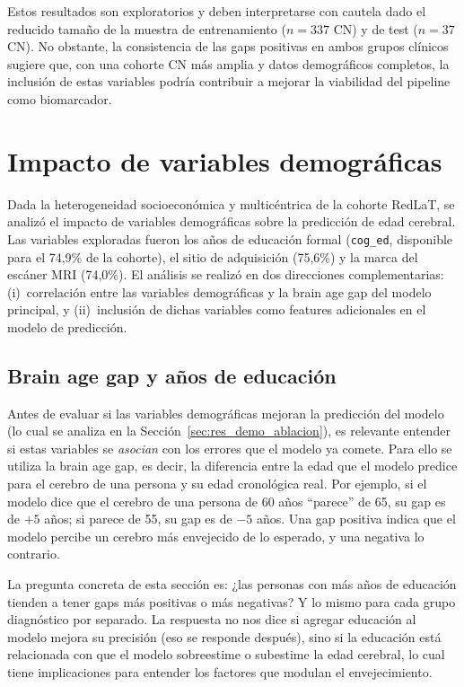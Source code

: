 Estos resultados son exploratorios y deben interpretarse con cautela dado el reducido tamaño de la muestra de entrenamiento ($n = 337$ CN) y de test ($n = 37$ CN). No obstante, la consistencia de las gaps positivas en ambos grupos clínicos sugiere que, con una cohorte CN más amplia y datos demográficos completos, la inclusión de estas variables podría contribuir a mejorar la viabilidad del pipeline como biomarcador.

\section{Impacto de variables demográficas}
\label{sec:res_demograficas}

Dada la heterogeneidad socioeconómica y multicéntrica de la cohorte RedLaT, se analizó el impacto de variables demográficas sobre la predicción de edad cerebral. Las variables exploradas fueron los años de educación formal (\texttt{cog\_ed}, disponible para el 74,9\% de la cohorte), el sitio de adquisición (75,6\%) y la marca del escáner MRI (74,0\%). El análisis se realizó en dos direcciones complementarias: (i)~correlación entre las variables demográficas y la brain age gap del modelo principal, y (ii)~inclusión de dichas variables como features adicionales en el modelo de predicción.

\subsection{Brain age gap y años de educación}
\label{sec:res_gap_educacion}

Antes de evaluar si las variables demográficas mejoran la predicción del modelo (lo cual se analiza en la Sección~\ref{sec:res_demo_ablacion}), es relevante entender si estas variables se \emph{asocian} con los errores que el modelo ya comete. Para ello se utiliza la brain age gap, es decir, la diferencia entre la edad que el modelo predice para el cerebro de una persona y su edad cronológica real. Por ejemplo, si el modelo dice que el cerebro de una persona de 60 años ``parece'' de 65, su gap es de $+5$ años; si parece de 55, su gap es de $-5$ años. Una gap positiva indica que el modelo percibe un cerebro más envejecido de lo esperado, y una negativa lo contrario.

La pregunta concreta de esta sección es: ¿las personas con más años de educación tienden a tener gaps más positivas o más negativas? Y lo mismo para cada grupo diagnóstico por separado. La respuesta no nos dice si agregar educación al modelo mejora su precisión (eso se responde después), sino si la educación está relacionada con que el modelo sobreestime o subestime la edad cerebral, lo cual tiene implicaciones para entender los factores que modulan el envejecimiento.

